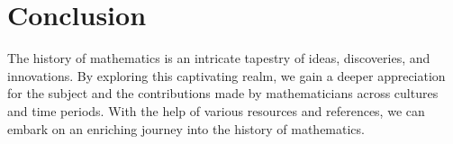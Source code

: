 \documentclass{article}
\begin{document}
\section{Conclusion}
The history of mathematics is an intricate tapestry of ideas, discoveries, and innovations. By exploring this captivating realm, we gain a deeper appreciation for the subject and the contributions made by mathematicians across cultures and time periods. With the help of various resources and references, we can embark on an enriching journey into the history of mathematics.
\end{document}
